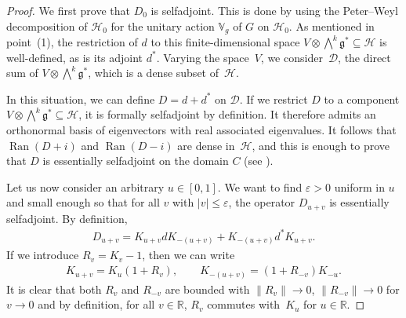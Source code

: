 \documentclass[11pt]{article}
\newcommand{\Core}{C}
\newcommand{\Dd}{\mathscr{D}}
\newcommand{\Hh}{\mathscr{H}}
\newcommand{\LieG}{\mathfrak{g}}
\newcommand{\R}{\mathbb{R}}
\newcommand{\RepV}{\mathbb{V}}
\DeclareMathOperator{\Ran}{Ran}
\numberwithin{equation}{section}
\begin{document}
\begin{proof}
We f\/irst prove that $D_0$ is selfadjoint. This is done by using the Peter--Weyl decomposition of $\Hh_0$ for the unitary action $\RepV_g$ of $G$ on $\Hh_0$. As mentioned in point~(1), %
the restriction of $d$ to this f\/inite-dimensional space $V \otimes \bigwedge^k \LieG^* \subseteq \Hh$ is well-def\/ined, as is its adjoint $d^*$. Varying the space~$V$, we consider~$\Dd$, the direct sum of $V \otimes \bigwedge^k \LieG^*$, which is a dense subset of~$\Hh$.

In this situation, we can def\/ine $D = d + d^*$ on $\Dd$. If we restrict $D$ to a component $V \otimes \bigwedge^k \LieG^* \subseteq \Hh$, it is formally selfadjoint by def\/inition. It therefore admits an orthonormal basis of eigenvectors with real associated eigenvalues. It follows that $\Ran(D +i)$ and $\Ran(D -i)$ are dense in~$\Hh$, and this is enough to prove that $D$ is essentially selfadjoint on the domain $\Core$ (see \cite[Corollary, p.~257]{ReedSimon1}).

Let us now consider an arbitrary $u \in [0,1]$. We want to f\/ind $\varepsilon > 0$ uniform in $u$ and small enough so that for all $v$ with $|v| \leqslant \varepsilon$, the operator $D_{u+v}$ is essentially selfadjoint. By def\/inition,
\begin{gather*}
D_{u+v} = K_{u+v} d K_{-(u+v)} + K_{-(u+v)} d^* K_{u+v}.
\end{gather*}
If we introduce $R_v = K_v -1$, then we can write
\begin{gather*}
K_{u+v} = K_u (1 + R_v),
\qquad
K_{-(u+v)} = (1 + R_{-v}) K_{-u}.
\end{gather*}
It is clear that both $R_v$ and $R_{-v}$ are bounded with $\|R_v \| \to 0$, $\|R_{-v} \| \to 0$ for $v \to 0$ and by def\/inition, for all $v \in \R$, $R_v$ commutes with~$K_u$ for $u \in \R$.


\end{proof}
\end{document}
